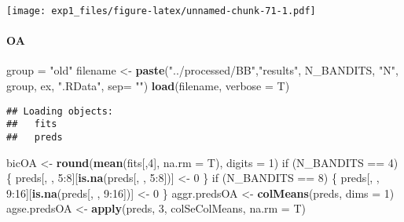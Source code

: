 \documentclass[11pt,,]{article}
\newenvironment{Shaded}{\begin{snugshade}}{\end{snugshade}}
\newcommand{\KeywordTok}[1]{\textcolor[rgb]{0.13,0.29,0.53}{\textbf{{#1}}}}
\newcommand{\DataTypeTok}[1]{\textcolor[rgb]{0.13,0.29,0.53}{{#1}}}
\newcommand{\DecValTok}[1]{\textcolor[rgb]{0.00,0.00,0.81}{{#1}}}
\newcommand{\StringTok}[1]{\textcolor[rgb]{0.31,0.60,0.02}{{#1}}}
\newcommand{\NormalTok}[1]{{#1}}
\let\oldparagraph\paragraph
\renewcommand{\paragraph}[1]{\oldparagraph{#1}\mbox{}}
\begin{document}
\texttt{[image: exp1\_files/figure-latex/unnamed-chunk-71-1.pdf]}

\newpage

\paragraph{OA}\label{oa-1}

\begin{Shaded}
\begin{Highlighting}[]
\NormalTok{group =}\StringTok{ "old"}
\NormalTok{filename  <-}\StringTok{ }\KeywordTok{paste}\NormalTok{(}\StringTok{"../processed/BB"}\NormalTok{,}\StringTok{"results"}\NormalTok{, N_BANDITS, }\StringTok{"N"}\NormalTok{, }
                   \NormalTok{group, ex, }\StringTok{".RData"}\NormalTok{, }\DataTypeTok{sep=} \StringTok{""}\NormalTok{)}
\KeywordTok{load}\NormalTok{(filename, }\DataTypeTok{verbose =} \NormalTok{T)}
\end{Highlighting}
\end{Shaded}

\begin{verbatim}
## Loading objects:
##   fits
##   preds
\end{verbatim}

\begin{Shaded}
\begin{Highlighting}[]
\NormalTok{bicOA <-}\StringTok{ }\KeywordTok{round}\NormalTok{(}\KeywordTok{mean}\NormalTok{(fits[,}\DecValTok{4}\NormalTok{], }\DataTypeTok{na.rm =} \NormalTok{T), }\DataTypeTok{digits =} \DecValTok{1}\NormalTok{)}
\NormalTok{if (N_BANDITS ==}\StringTok{ }\DecValTok{4}\NormalTok{) \{}
    \NormalTok{preds[, , }\DecValTok{5}\NormalTok{:}\DecValTok{8}\NormalTok{][}\KeywordTok{is.na}\NormalTok{(preds[, , }\DecValTok{5}\NormalTok{:}\DecValTok{8}\NormalTok{])] <-}\StringTok{ }\DecValTok{0}
\NormalTok{\}}
\NormalTok{if (N_BANDITS ==}\StringTok{ }\DecValTok{8}\NormalTok{) \{}
    \NormalTok{preds[, , }\DecValTok{9}\NormalTok{:}\DecValTok{16}\NormalTok{][}\KeywordTok{is.na}\NormalTok{(preds[, , }\DecValTok{9}\NormalTok{:}\DecValTok{16}\NormalTok{])] <-}\StringTok{ }\DecValTok{0}
\NormalTok{\}}
\NormalTok{aggr.predsOA <-}\StringTok{ }\KeywordTok{colMeans}\NormalTok{(preds, }\DataTypeTok{dims =} \DecValTok{1}\NormalTok{) }
\NormalTok{agse.predsOA <-}\StringTok{ }\KeywordTok{apply}\NormalTok{(preds, }\DecValTok{3}\NormalTok{, colSeColMeans, }\DataTypeTok{na.rm =} \NormalTok{T) }
\end{Highlighting}
\end{Shaded}
\end{document}
